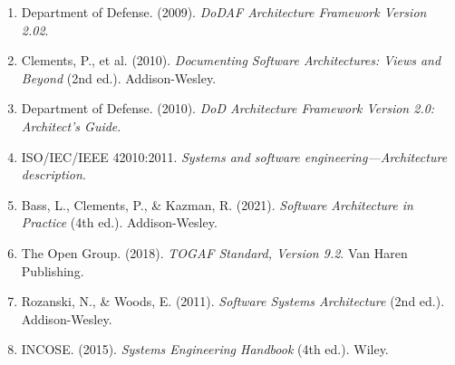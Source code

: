 \documentclass[11pt]{article}
\begin{document}
\begin{enumerate}
    \item Department of Defense. (2009). \textit{DoDAF Architecture Framework Version 2.02}.

    \item Clements, P., et al. (2010). \textit{Documenting Software Architectures: Views and Beyond} (2nd ed.). Addison-Wesley.

    \item Department of Defense. (2010). \textit{DoD Architecture Framework Version 2.0: Architect's Guide}.

    \item ISO/IEC/IEEE 42010:2011. \textit{Systems and software engineering---Architecture description}.

    \item Bass, L., Clements, P., \& Kazman, R. (2021). \textit{Software Architecture in Practice} (4th ed.). Addison-Wesley.

    \item The Open Group. (2018). \textit{TOGAF Standard, Version 9.2}. Van Haren Publishing.

    \item Rozanski, N., \& Woods, E. (2011). \textit{Software Systems Architecture} (2nd ed.). Addison-Wesley.

    \item INCOSE. (2015). \textit{Systems Engineering Handbook} (4th ed.). Wiley.
\end{enumerate}
\end{document}

